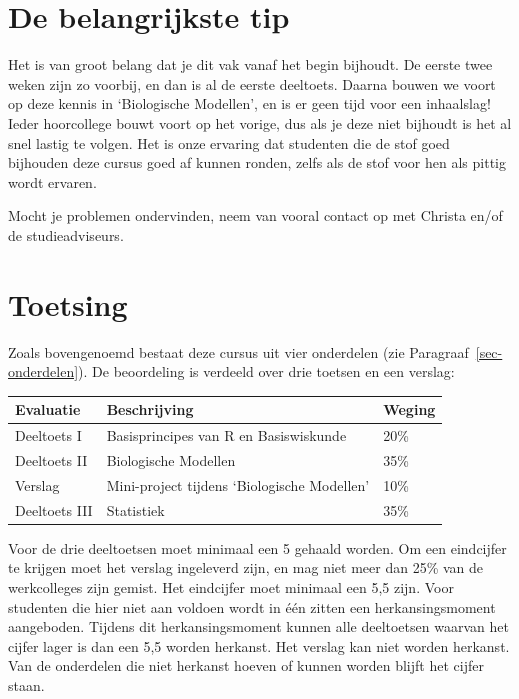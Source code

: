 \documentclass[
  a4paper,
]{scrbook}
\theoremstyle{definition}
\theoremstyle{remark}
\begin{document}
\section{De belangrijkste tip}\label{de-belangrijkste-tip}

Het is van groot belang dat je dit vak vanaf het begin bijhoudt. De
eerste twee weken zijn zo voorbij, en dan is al de eerste deeltoets.
Daarna bouwen we voort op deze kennis in `Biologische Modellen', en is
er geen tijd voor een inhaalslag! Ieder hoorcollege bouwt voort op het
vorige, dus als je deze niet bijhoudt is het al snel lastig te volgen.
Het is onze ervaring dat studenten die de stof goed bijhouden deze
cursus goed af kunnen ronden, zelfs als de stof voor hen als pittig
wordt ervaren.

Mocht je problemen ondervinden, neem van vooral contact op met Christa
en/of de studieadviseurs.

\section{Toetsing}\label{toetsing}

Zoals bovengenoemd bestaat deze cursus uit vier onderdelen (zie
Paragraaf~\ref{sec-onderdelen}). De beoordeling is verdeeld over drie
toetsen en een verslag:

\begin{longtable}[]{@{}lll@{}}
\toprule\noalign{}
Evaluatie & Beschrijving & Weging \\
\midrule\noalign{}
\endhead
\bottomrule\noalign{}
\endlastfoot
Deeltoets I & Basisprincipes van R en Basiswiskunde & 20\% \\
Deeltoets II & Biologische Modellen & 35\% \\
Verslag & Mini-project tijdens `Biologische Modellen' & 10\% \\
Deeltoets III & Statistiek & 35\% \\
\end{longtable}

Voor de drie deeltoetsen moet minimaal een 5 gehaald worden. Om een
eindcijfer te krijgen moet het verslag ingeleverd zijn, en mag niet meer
dan 25\% van de werkcolleges zijn gemist. Het eindcijfer moet minimaal
een 5,5 zijn. Voor studenten die hier niet aan voldoen wordt in één
zitten een herkansingsmoment aangeboden. Tijdens dit herkansingsmoment
kunnen alle deeltoetsen waarvan het cijfer lager is dan een 5,5 worden
herkanst. Het verslag kan niet worden herkanst. Van de onderdelen die
niet herkanst hoeven of kunnen worden blijft het cijfer staan.
\end{document}
